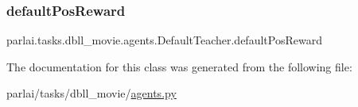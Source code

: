 \subsubsection{\texorpdfstring{default\+Pos\+Reward}{defaultPosReward}}
{\footnotesize\ttfamily parlai.\+tasks.\+dbll\+\_\+movie.\+agents.\+Default\+Teacher.\+default\+Pos\+Reward}



The documentation for this class was generated from the following file\+:\begin{DoxyCompactItemize}
\item 
parlai/tasks/dbll\+\_\+movie/\hyperlink{parlai_2tasks_2dbll__movie_2agents_8py}{agents.\+py}\end{DoxyCompactItemize}
